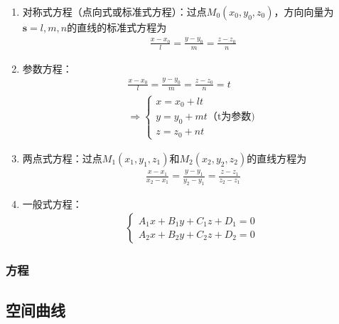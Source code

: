\documentclass[12pt]{book}
\begin{document}
\begin{enumerate}[1.]
    \item 对称式方程（点向式或标准式方程）：过点$M_{0}(x_0,y_0,z_0)$，方向向量为$\bm{s}={l,m,n}$的直线的标准式方程为
    \begin{gather*}
        \frac{x-x_0}{l}=\frac{y-y_0}{m}=\frac{z-z_0}{n}
    \end{gather*}
    \item 参数方程：
    \begin{gather*}
        \frac{x-x_0}{l}=\frac{y-y_0}{m}=\frac{z-z_0}{n}=t \\ \Rightarrow
        \begin{cases}
            x=x_0+lt \\
            y=y_0+mt \text{（t为参数)}\\
            z=z_0+nt 
        \end{cases}
    \end{gather*}
    \item 两点式方程：过点$M_{1}(x_1,y_1,z_1)$和$M_{2}(x_2,y_2,z_2)$的直线方程为
    \begin{gather*}
        \frac{x-x_1}{x_2-x_1}=\frac{y-y_1}{y_2-y_1}=\frac{z-z_1}{z_2-z_1}
    \end{gather*}
    \item 一般式方程：
    \begin{gather*}
        \begin{cases}
            A_{1}x+B_{1}y+C_{1}z+D_{1}=0\\
            A_{2}x+B_{2}y+C_{2}z+D_{2}=0\
        \end{cases}
    \end{gather*}
\end{enumerate}


\subsubsection{方程}















\subsection{空间曲线}
\end{document}

